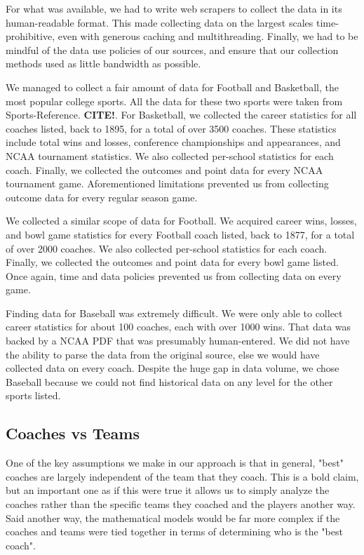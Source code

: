 \documentclass[titlepage,12pt]{article}
\begin{document}
For what was available, we had to write web scrapers to collect the data in its human-readable format. This made collecting data on the largest scales time-prohibitive, even with generous caching and multithreading. Finally, we had to be mindful of the data use policies of our sources, and ensure that our collection methods used as little bandwidth as possible.

We managed to collect a fair amount of data for Football and Basketball, the most popular college sports. All the data for these two sports were taken from Sports-Reference. \textbf{CITE!}. For Basketball, we collected the career statistics for all coaches listed, back to 1895, for a total of over 3500 coaches. These statistics include total wins and losses, conference championships and appearances, and NCAA tournament statistics. We also collected per-school statistics for each coach. Finally, we collected the outcomes and point data for every NCAA tournament game. Aforementioned limitations prevented us from collecting outcome data for every regular season game. 

We collected a similar scope of data for Football. We acquired career wins, losses, and bowl game statistics for every Football coach listed, back to 1877, for a total of over 2000 coaches. We also collected per-school statistics for each coach. Finally, we collected the outcomes and point data for every bowl game listed. Once again, time and data policies prevented us from collecting data on every game.

Finding data for Baseball was extremely difficult. We were only able to collect career statistics for about 100 coaches, each with over 1000 wins. That data was backed by a NCAA PDF that was presumably human-entered. We did not have the ability to parse the data from the original source, else we would have collected data on every coach. Despite the huge gap in data volume, we chose Baseball because we could not find historical data on any level for the other sports listed.

\subsection{Coaches vs Teams}

One of the key assumptions we make in our approach is that in general, "best" coaches are largely independent of the team that they coach. This is a bold claim, but an important one as if this were true it allows us to simply analyze the coaches rather than the specific teams they coached and the players another way. Said another way, the mathematical models would be far more complex if the coaches and teams were tied together in terms of determining who is the "best coach". 
\end{document}
